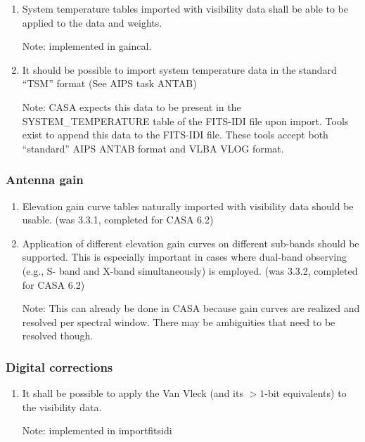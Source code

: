 \documentclass[11pt,a4paper]{article}
\begin{document}
\begin{enumerate}[subsubseclist]

  \item System temperature tables imported with visibility data shall
    be able to be applied to the data and weights.

    Note: implemented in gaincal.

  \item It should be possible to import system temperature data in the
    standard ``TSM'' format (See AIPS task ANTAB)

    Note: CASA expects this data to be present in the
    SYSTEM\_TEMPERATURE table of the FITS-IDI file upon import.  Tools
    exist to append this data to the FITS-IDI file.  These tools
    accept both ``standard'' AIPS ANTAB format and VLBA VLOG format.

\end{enumerate}


\subsubsection{Antenna gain}

\begin{enumerate}[subsubseclist]

\item Elevation gain curve tables naturally imported with visibility
  data should be usable.  (was 3.3.1, completed for CASA 6.2)

\item Application of different elevation gain curves on different
  sub-bands should be supported.  This is especially important in
  cases where dual-band observing (e.g., S- band and X-band
  simultaneously) is employed.  (was 3.3.2, completed for CASA 6.2)

  Note: This can already be done in CASA because gain curves are
  realized and resolved per spectral window.  There may be ambiguities
  that need to be resolved though.

\end{enumerate}


\subsubsection{Digital corrections}

\begin{enumerate}[subsubseclist]

\item It shall be possible to apply the Van Vleck (and its $>1$-bit
  equivalents) to the visibility data.

  Note: implemented in importfitsidi

\end{enumerate}
\end{document}
